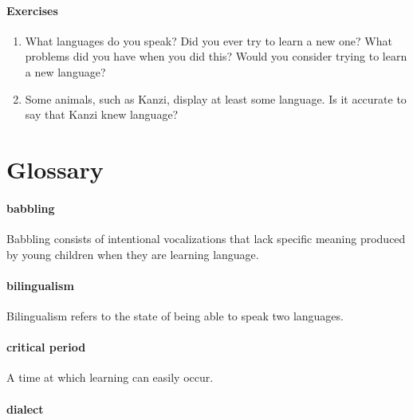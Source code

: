 \documentclass[
]{krantz}
\providecommand{\tightlist}{%
  \setlength{\itemsep}{0pt}\setlength{\parskip}{0pt}}
\begin{document}
\paragraph*{Exercises}\label{exercises-7}

\begin{enumerate}
\def\labelenumi{\arabic{enumi}.}
\tightlist
\item
  What languages do you speak? Did you ever try to learn a new one? What problems did you have when you did this? Would you consider trying to learn a new language?
\item
  Some animals, such as Kanzi, display at least some language. Is it accurate to say that Kanzi knew language?
\end{enumerate}

\section{Glossary}\label{glossary-7}

\paragraph*{babbling}\label{babbling}

Babbling consists of intentional vocalizations that lack specific meaning produced by young children when they are learning language.

\paragraph*{bilingualism}\label{bilingualism-1}

Bilingualism refers to the state of being able to speak two languages.

\paragraph*{critical period}\label{critical-period}

A time at which learning can easily occur.

\paragraph*{dialect}\label{dialect}
\end{document}
